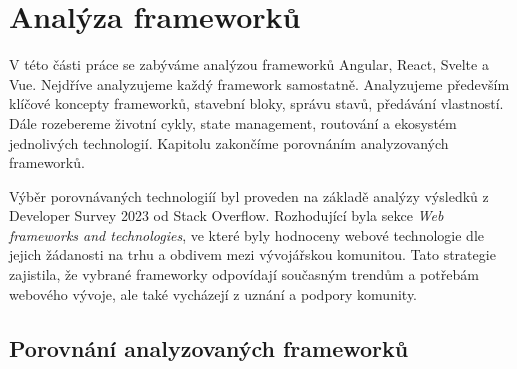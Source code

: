 \section{Analýza frameworků}

\begin{zvyraznenyodstavec}
V této části práce se zabýváme analýzou frameworků Angular, React, Svelte a Vue. Nejdříve analyzujeme každý framework samostatně. 
Analyzujeme především klíčové koncepty frameworků, stavební bloky, správu stavů, předávání vlastností. 
Dále rozebereme životní cykly, state management, routování a ekosystém jednolivých technologií. 
Kapitolu zakončíme porovnáním analyzovaných frameworků.
\end{zvyraznenyodstavec}

Výběr porovnávaných technologiíí byl proveden na základě analýzy výsledků z Developer Survey 2023 od Stack Overflow. 
Rozhodující byla sekce \emph{Web frameworks and technologies}, ve které byly hodnoceny webové technologie dle jejich žádanosti na trhu a obdivem mezi vývojářskou komunitou. 
Tato strategie zajistila, že vybrané frameworky odpovídají současným trendům a potřebám webového vývoje, ale také vycházejí z uznání a podpory komunity.\cite{stackoverflow, developersurvey}







\subsection{Porovnání analyzovaných frameworků}

